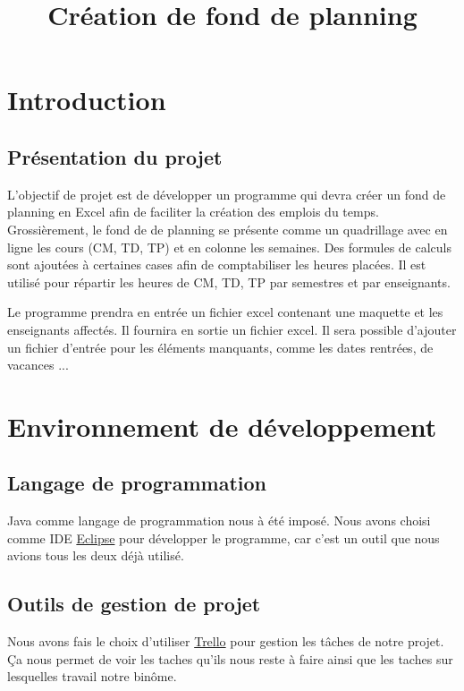 \documentclass{polytech/polytech}
\title{Création de fond de planning}
\begin{document}
	\chapter{Introduction}
	\section{Présentation du projet}
	L’objectif de projet est de développer un programme qui devra créer un fond de planning en Excel afin de faciliter la création des emplois du temps.
	Grossièrement, le fond de de planning se présente comme un quadrillage avec en ligne les cours (CM, TD, TP) et en colonne les semaines.
	Des formules de calculs sont ajoutées à certaines cases afin de comptabiliser les heures placées.
	Il est utilisé pour répartir les heures de CM, TD, TP par semestres et par enseignants.
	
	Le programme prendra en entrée un fichier excel contenant une maquette et les enseignants affectés. Il fournira en sortie un fichier excel.
	Il sera possible d'ajouter un fichier d'entrée pour les éléments manquants, comme les dates rentrées, de vacances ...

	\chapter{Environnement de développement}
	\section{Langage de programmation}
	
	Java comme langage de programmation nous à été imposé.
	Nous avons choisi comme IDE \href{http://www.eclipse.org}{Eclipse} pour développer le programme, car c'est un outil que nous avions tous les deux déjà utilisé.


	\section{Outils de gestion de projet}

	Nous avons fais le choix d'utiliser \href{https://trello.com/}{Trello} pour gestion les tâches de notre projet.
	Ça nous permet de voir les taches qu'ils nous reste à faire ainsi que les taches sur lesquelles travail notre binôme.
	
\end{document}
